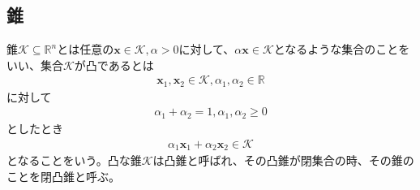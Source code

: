 \subsection{錐}
錐$\mathcal{K} \subseteq \mathbb{R}^n$とは任意の$\mathbf{x} \in \mathcal{K}, \alpha > 0$に対して、$\alpha \mathbf{x} \in \mathcal{K}$となるような集合のことをいい、集合$\mathcal{K}$が凸であるとは
\begin{align*}
  \mathbf{x}_1, \mathbf{x}_2 \in \mathcal{K}, \alpha_1, \alpha_2 \in \mathbb{R}
\end{align*}
に対して
\begin{align*}
  \alpha_1 + \alpha_2 = 1, \alpha_1, \alpha_2 \geq 0
\end{align*}
としたとき
\begin{align*}
  \alpha_1 \mathbf{x}_1 + \alpha_2 \mathbf{x}_2 \in \mathcal{K}
\end{align*}
となることをいう。凸な錐$\mathcal{K}$は凸錐と呼ばれ、その凸錐が閉集合の時、その錐のことを閉凸錐と呼ぶ。


